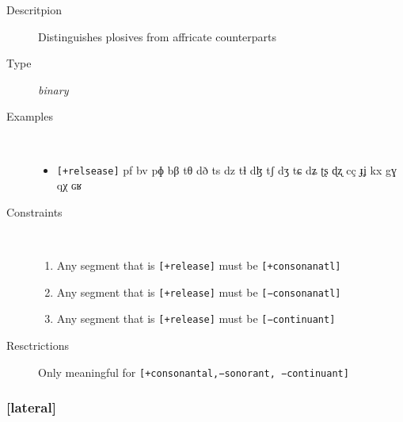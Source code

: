 \documentclass[10pt,letterpaper]{article}
\begin{document}
\begin{description}
\item[Descritpion] Distinguishes plosives from affricate counterparts
\item[Type] \emph{binary}
\item[Examples]\
  \begin{itemize}
    \item \texttt{[+relsease]}
    pf bv pɸ bβ tθ dð ts dz tɬ dɮ tʃ dʒ tɕ dʑ ʈʂ ɖʐ cç ɟʝ kx gɣ qχ ɢʁ
  \end{itemize}
\item[Constraints]\
  \begin{enumerate}
    \item Any segment that is \texttt{[+release]} must be \texttt{[+consonanatl]}
    \item Any segment that is \texttt{[+release]} must be \texttt{[−consonanatl]}
    \item Any segment that is \texttt{[+release]} must be \texttt{[−continuant]}
  \end{enumerate}
\item[Resctrictions] Only meaningful for \texttt{[+consonantal,−sonorant, −continuant]}
\end{description}

\subsubsection{[lateral]}
\label{ssub:feature_lateral}

\end{document}
